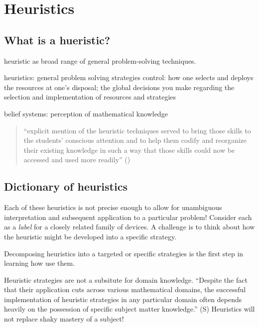 \documentclass[
  a4paper,
  DIV=11,
  numbers=noendperiod,
  oneside]{scrreprt}
\begin{document}
\chapter{Heuristics}\label{sec-heuristics}

\section{What is a hueristic?}\label{what-is-a-hueristic}

heuristic as broad range of general problem-solving techniques.

heuristics: general problem solving strategies control: how one selects
and deploys the resources at one's disposal; the global decisions you
make regarding the selection and implementation of resources and
strategies

belief systems: perception of mathematical knowledge

\begin{quote}
``explicit mention of the heuristic techniques served to bring those
skills to the students' conscious attention and to help them codify and
reorganize their existing knowledge in such a way that those skills
could now be accessed and used more readily''
()
\end{quote}

\section{Dictionary of heuristics}\label{dictionary-of-heuristics}

Each of these heuristics is not precise enough to allow for unambiguous
interpretation and subsequent application to a particular problem!
Consider each as a \emph{label} for a closely related family of devices.
A challenge is to think about how the heuristic might be developed into
a specific strategy.

Decomposing heuristics into a targeted or specific strategies is the
first step in learning how use them.

\begin{tcolorbox}[enhanced jigsaw, breakable, colframe=quarto-callout-warning-color-frame, leftrule=.75mm, arc=.35mm, toptitle=1mm, rightrule=.15mm, left=2mm, colbacktitle=quarto-callout-warning-color!10!white, bottomtitle=1mm, titlerule=0mm, bottomrule=.15mm, toprule=.15mm, coltitle=black, opacityback=0, title=\textcolor{quarto-callout-warning-color}{\faExclamationTriangle}\hspace{0.5em}{Frameworks are not substitution for knowledge!}, opacitybacktitle=0.6, colback=white]

Heuristic strategies are not a subsitute for domain knowledge. ``Despite
the fact that their application cuts across various mathematical
domains, the successful implementation of heuristic strategies in any
particular domain often depends heavily on the possession of specific
subject matter knowledge.'' (S) Heuristics will not replace shaky
mastery of a subject!

\end{tcolorbox}
\end{document}
